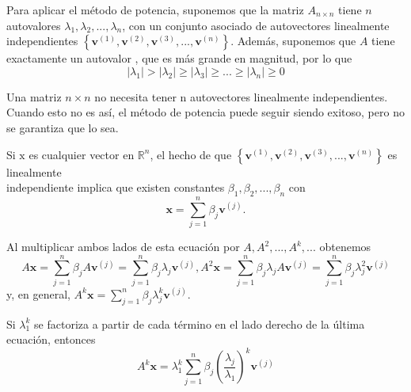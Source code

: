 \documentclass[12pt, a4paper]{article}
\numberwithin{subsection}{section} %
\begin{document}
        Para aplicar el método de potencia, suponemos que la matriz $A_{n\times n}$ tiene $n$ autovalores $\lambda_{1}, \lambda_{2}, ..., \lambda_{n}$, con un conjunto asociado de autovectores linealmente independientes $\left\{ \textbf{v}^{\left( 1 \right)}, \textbf{v}^{\left( 2 \right)}, \textbf{v}^{\left( 3 \right)}, ..., \textbf{v}^{\left( n \right)} \right\}$. Además, suponemos que $A$ tiene exactamente un autovalor , que es más grande en magnitud, por lo que
        \begin{equation*}
        \left| \lambda_{1} \right| > \left| \lambda_{2} \right| \ge \left| \lambda_{3} \right| \ge ... \ge \left| \lambda_{n} \right| \ge 0
        \end{equation*}
        
        Una matriz $n\times n$ no necesita tener n autovectores linealmente independientes. Cuando esto no es así, el método de potencia puede seguir siendo exitoso, pero no se garantiza que lo sea.
        
        Si $\text{x}$ es cualquier vector en $\mathbb{R}^{n}$, el hecho de que $\left\{ \textbf{v}^{\left( 1 \right)}, \textbf{v}^{\left( 2 \right)}, \textbf{v}^{\left( 3 \right)}, ..., \textbf{v}^{\left( n \right)} \right\}$ es linealmente \\independiente implica que existen constantes $\beta_{1}, \beta_{2}, ..., \beta_{n}$ con
        \begin{equation*}
        \textbf{x} = \sum_{j=1}^{n} \beta_{j} \textbf{v}^{\left( j \right)}.
        \end{equation*}
        
        Al multiplicar ambos lados de esta ecuación por $A, A^{2}, ..., A^{k}, ...$ obtenemos
        \begin{equation*}
        A \textbf{x} = \sum_{j=1}^{n} \beta_{j} A \textbf{v}^{\left( j \right)} = \sum_{j=1}^{n} \beta_{j} \lambda_{j} \textbf{v}^{\left( j \right)}, A^{2} \textbf{x} = \sum_{j=1}^{n} \beta_{j} \lambda_{j} A \textbf{v}^{\left( j \right)} = \sum_{j=1}^{n} \beta_{j} \lambda_{j}^{2} \textbf{v}^{\left( j \right)}
        \end{equation*}
        y, en general, $A^{k} \textbf{x} = \sum_{j=1}^{n} \beta_{j} \lambda_{j}^{k} \textbf{v}^{\left( j \right)}$.
        
        Si $\lambda_{1}^{k}$ se factoriza a partir de cada término en el lado derecho de la última ecuación, entonces
        \begin{equation*}
        A^{k} \textbf{x} = \lambda_{1}^{k} \sum_{j=1}^{n} \beta_{j} \left( \frac{\lambda_{j}}{\lambda_{1}} \right)^{k} \textbf{v}^{\left( j \right)}
        \end{equation*}
        
\end{document}
